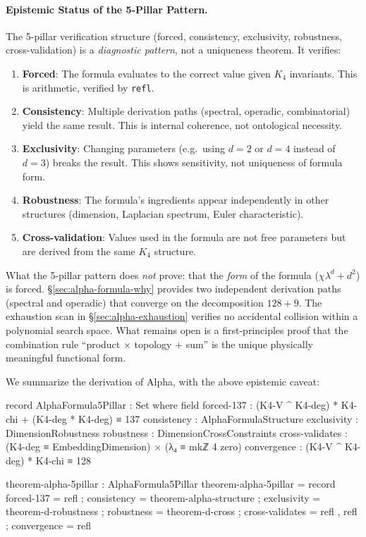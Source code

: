 \documentclass[11pt,a4paper]{book}
\begin{document}
\paragraph{Epistemic Status of the 5-Pillar Pattern.}
The 5-pillar verification structure (forced, consistency, exclusivity, robustness,
cross-validation) is a \emph{diagnostic pattern}, not a uniqueness theorem. It verifies:
\begin{enumerate}
\item \textbf{Forced}: The formula evaluates to the correct value given $K_4$ invariants.
  This is arithmetic, verified by \texttt{refl}.
\item \textbf{Consistency}: Multiple derivation paths (spectral, operadic, combinatorial)
  yield the same result. This is internal coherence, not ontological necessity.
\item \textbf{Exclusivity}: Changing parameters (e.g.\ using $d=2$ or $d=4$ instead of $d=3$)
  breaks the result. This shows sensitivity, not uniqueness of formula form.
\item \textbf{Robustness}: The formula's ingredients appear independently in other structures
  (dimension, Laplacian spectrum, Euler characteristic).
\item \textbf{Cross-validation}: Values used in the formula are not free parameters but are
  derived from the same $K_4$ structure.
\end{enumerate}
What the 5-pillar pattern does \emph{not} prove: that the \emph{form} of the formula
($\chi\lambda^d + d^2$) is forced. \S\ref{sec:alpha-formula-why} provides two independent
derivation paths (spectral and operadic) that converge on the decomposition $128 + 9$.
The exhaustion scan in \S\ref{sec:alpha-exhaustion} verifies no accidental collision
within a polynomial search space. What remains open is a first-principles proof
that the combination rule ``product $\times$ topology $+$ sum'' is the unique
physically meaningful functional form.

We summarize the derivation of Alpha, with the above epistemic caveat:

\begin{code}
record AlphaFormula5Pillar : Set where
  field
    forced-137 : (K4-V ^ K4-deg) * K4-chi + (K4-deg * K4-deg) ≡ 137
    consistency     : AlphaFormulaStructure
    exclusivity     : DimensionRobustness
    robustness      : DimensionCrossConstraints
    cross-validates : (K4-deg ≡ EmbeddingDimension) × (λ₄ ≡ mkℤ 4 zero)
    convergence     : (K4-V ^ K4-deg) * K4-chi ≡ 128

theorem-alpha-5pillar : AlphaFormula5Pillar
theorem-alpha-5pillar = record
  { forced-137      = refl
  ; consistency     = theorem-alpha-structure
  ; exclusivity     = theorem-d-robustness
  ; robustness      = theorem-d-cross
  ; cross-validates = refl , refl
  ; convergence     = refl
  }
\end{code}
\end{document}

